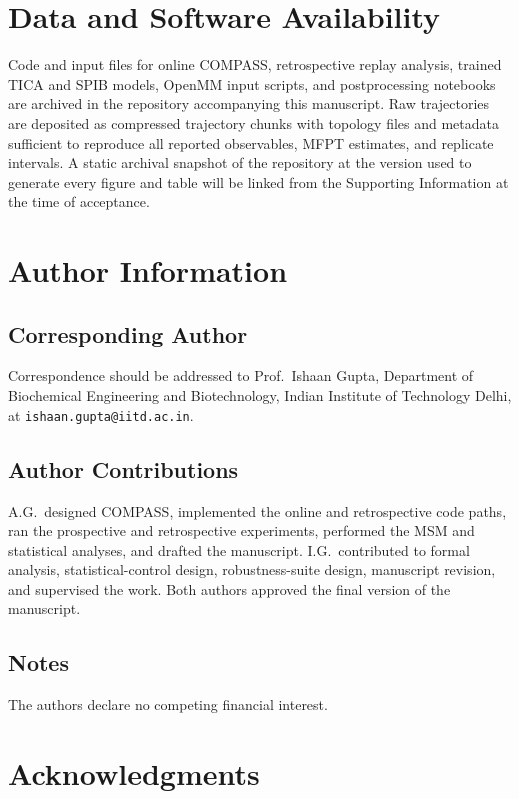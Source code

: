 \documentclass[journal=jctcce,manuscript=article,layout=twocolumn]{achemso}
\begin{document}
\section{Data and Software Availability}

Code and input files for online COMPASS, retrospective replay analysis, trained TICA and SPIB models, OpenMM input scripts, and postprocessing notebooks are archived in the repository accompanying this manuscript. Raw trajectories are deposited as compressed trajectory chunks with topology files and metadata sufficient to reproduce all reported observables, MFPT estimates, and replicate intervals. A static archival snapshot of the repository at the version used to generate every figure and table will be linked from the Supporting Information at the time of acceptance.

\section{Author Information}

\subsection{Corresponding Author}
Correspondence should be addressed to Prof.\ Ishaan Gupta, Department of Biochemical Engineering and Biotechnology, Indian Institute of Technology Delhi, at \texttt{ishaan.gupta@iitd.ac.in}.

\subsection{Author Contributions}
A.G.\ designed COMPASS, implemented the online and retrospective code paths, ran the prospective and retrospective experiments, performed the MSM and statistical analyses, and drafted the manuscript. I.G.\ contributed to formal analysis, statistical-control design, robustness-suite design, manuscript revision, and supervised the work. Both authors approved the final version of the manuscript.

\subsection{Notes}
The authors declare no competing financial interest.

\section{Acknowledgments}
\end{document}
